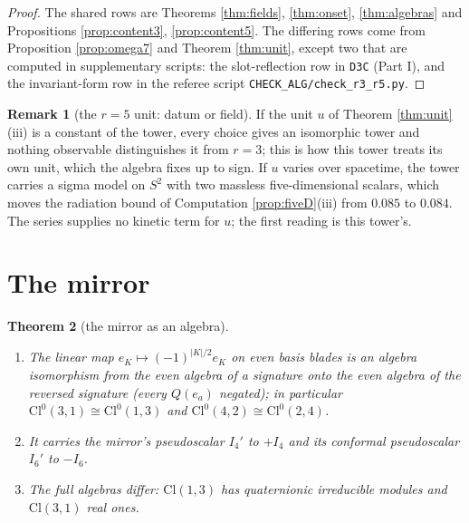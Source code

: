 \documentclass[11pt]{article}
\newtheorem{theorem}{Theorem}[section]
\theoremstyle{definition}
\newtheorem{remark}[theorem]{Remark}
\newcommand{\Cl}{\mathrm{Cl}}
\newcommand{\file}[1]{\texttt{#1}}
\begin{document}
\begin{proof}
The shared rows are Theorems \ref{thm:fields}, \ref{thm:onset}, \ref{thm:algebras} and Propositions \ref{prop:content3}, \ref{prop:content5}. The differing rows come from Proposition \ref{prop:omega7} and Theorem \ref{thm:unit}, except two that are computed in supplementary scripts: the slot-reflection row in \file{D3C} (Part I), and the invariant-form row in the referee script \file{CHECK\_ALG/check\_r3\_r5.py}.
\end{proof}

\begin{remark}[the $r = 5$ unit: datum or field]\label{rem:r5unit}
If the unit $u$ of Theorem \ref{thm:unit}(iii) is a constant of the tower, every choice gives an isomorphic tower and nothing observable distinguishes it from $r = 3$; this is how this tower treats its own unit, which the algebra fixes up to sign. If $u$ varies over spacetime, the tower carries a sigma model on $S^{2}$ with two massless five-dimensional scalars, which moves the radiation bound of Computation \ref{prop:fiveD}(iii) from $0.085$ to $0.084$. The series supplies no kinetic term for $u$; the first reading is this tower's.
\end{remark}

\section{The mirror}\label{sec:mirror}

\begin{theorem}[the mirror as an algebra]\label{thm:mirror}
\begin{enumerate}
\item[(i)] The linear map $e_{K} \mapsto (-1)^{|K|/2}e_{K}$ on even basis blades is an algebra isomorphism from the even algebra of a signature onto the even algebra of the reversed signature (every $Q(e_{a})$ negated); in particular $\Cl^{0}(3,1) \cong \Cl^{0}(1,3)$ and $\Cl^{0}(4,2) \cong \Cl^{0}(2,4)$.
\item[(ii)] It carries the mirror's pseudoscalar $I_{4}'$ to $+I_{4}$ and its conformal pseudoscalar $I_{6}'$ to $-I_{6}$.
\item[(iii)] The full algebras differ: $\Cl(1,3)$ has quaternionic irreducible modules and $\Cl(3,1)$ real ones.
\end{enumerate}
\end{theorem}
\end{document}
